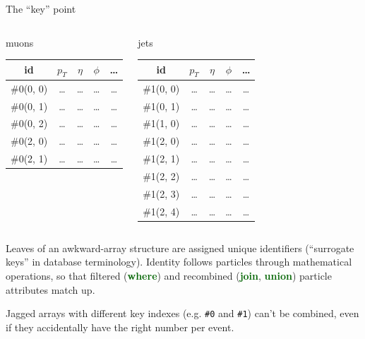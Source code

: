 \documentclass[aspectratio=169]{beamer}
\begin{document}
\begin{frame}{The ``key'' point}
\vspace{-0.25 cm}
\begin{columns}
\begin{center}
muons

\vspace{0.1 cm}
\begin{tabular}{| c | c c c c |}
\hline id & $p_T$ & $\eta$ & $\phi$ & \ldots \\\hline
\#0(0, 0) & \ldots & \ldots & \ldots & \ldots \\
\#0(0, 1) & \ldots & \ldots & \ldots & \ldots \\
\#0(0, 2) & \ldots & \ldots & \ldots & \ldots \\
\#0(2, 0) & \ldots & \ldots & \ldots & \ldots \\
\#0(2, 1) & \ldots & \ldots & \ldots & \ldots \\\hline
\end{tabular}
\end{center}

\begin{center}
jets

\vspace{0.1 cm}
\begin{tabular}{| c | c c c c |}
\hline id & $p_T$ & $\eta$ & $\phi$ & \ldots \\\hline
\#1(0, 0) & \ldots & \ldots & \ldots & \ldots \\
\#1(0, 1) & \ldots & \ldots & \ldots & \ldots \\
\#1(1, 0) & \ldots & \ldots & \ldots & \ldots \\
\#1(2, 0) & \ldots & \ldots & \ldots & \ldots \\
\#1(2, 1) & \ldots & \ldots & \ldots & \ldots \\
\#1(2, 2) & \ldots & \ldots & \ldots & \ldots \\
\#1(2, 3) & \ldots & \ldots & \ldots & \ldots \\
\#1(2, 4) & \ldots & \ldots & \ldots & \ldots \\
\hline
\end{tabular}
\end{center}
\end{columns}

\vspace{0.25 cm}
Leaves of an awkward-array structure are assigned unique identifiers (``surrogate keys'' in database terminology). Identity follows particles through mathematical operations, so that filtered (\textcolor{darkgreen}{\textbf{where}}) and recombined (\textcolor{darkgreen}{\textbf{join}}, \textcolor{darkgreen}{\textbf{union}}) particle attributes match up.

\vspace{0.25 cm}
Jagged arrays with different key indexes (e.g. {\tt \#0} and {\tt \#1}) can't be combined, even if they accidentally have the right number per event.
\end{frame}
\end{document}
